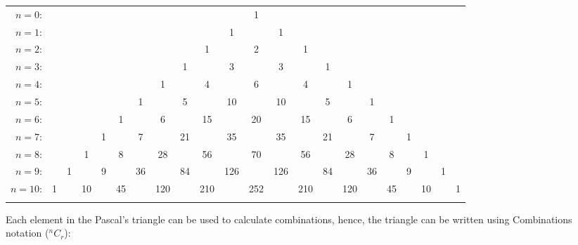 \documentclass{book}
\begin{document}
\begin{center}
	\begin{tabular}{rccccccccccccccccccccc}
		$n=0$:  &   &   &    &   &    &    &     &    &     &     & 1                                                     \\\noalign{\smallskip\smallskip}
		$n=1$:  &   &   &    &   &    &    &     &    &     & 1   &     & 1                                               \\\noalign{\smallskip\smallskip}
		$n=2$:  &   &   &    &   &    &    &     &    & 1   &     & 2   &     & 1                                         \\\noalign{\smallskip\smallskip}
		$n=3$:  &   &   &    &   &    &    &     & 1  &     & 3   &     & 3   &     & 1                                   \\\noalign{\smallskip\smallskip}
		$n=4$:  &   &   &    &   &    &    & 1   &    & 4   &     & 6   &     & 4   &    & 1                              \\\noalign{\smallskip\smallskip}
		$n=5$:  &   &   &    &   &    & 1  &     & 5  &     & 10  &     & 10  &     & 5  &     & 1                        \\\noalign{\smallskip\smallskip}
		$n=6$:  &   &   &    &   & 1  &    & 6   &    & 15  &     & 20  &     & 15  &    & 6   &    & 1                   \\\noalign{\smallskip\smallskip}
		$n=7$:  &   &   &    & 1 &    & 7  &     & 21 &     & 35  &     & 35  &     & 21 &     & 7  &    & 1              \\\noalign{\smallskip\smallskip}
		$n=8$:  &   &   & 1  &   & 8  &    & 28  &    & 56  &     & 70  &     & 56  &    & 28  &    & 8  &   & 1          \\\noalign{\smallskip\smallskip}
		$n=9$:  &   & 1 &    & 9 &    & 36 &     & 84 &     & 126 &     & 126 &     & 84 &     & 36 &    & 9 &    & 1     \\\noalign{\smallskip\smallskip}
		$n=10$: & 1 &   & 10 &   & 45 &    & 120 &    & 210 &     & 252 &     & 210 &    & 120 &    & 45 &   & 10 &   & 1 \\\noalign{\smallskip\smallskip}
	\end{tabular}
\end{center}

Each element in the Pascal's triangle can be used to calculate combinations, hence, the triangle can be written using Combinations notation ($^{n}C_r$):
\end{document}
